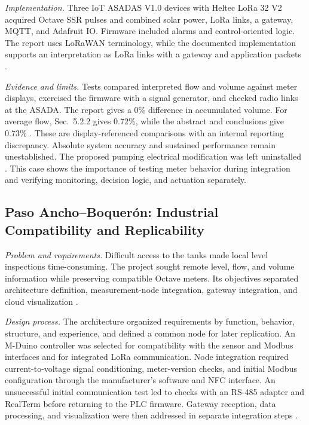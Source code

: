 \documentclass[conference]{IEEEtran}
\begin{document}
\textit{Implementation.} Three IoT ASADAS V1.0 devices with Heltec LoRa 32 V2 acquired Octave SSR pulses and combined solar power, LoRa links, a gateway, MQTT, and Adafruit IO. Firmware included alarms and control-oriented logic. The report uses LoRaWAN terminology, while the documented implementation supports an interpretation as LoRa links with a gateway and application packets \cite[Chs.~4--6]{solorzano2021sistema}.

\textit{Evidence and limits.} Tests compared interpreted flow and volume against meter displays, exercised the firmware with a signal generator, and checked radio links at the ASADA. The report gives a 0\% difference in accumulated volume. For average flow, Sec.~5.2.2 gives 0.72\%, while the abstract and conclusions give 0.73\% \cite{solorzano2021sistema}. These are display-referenced comparisons with an internal reporting discrepancy. Absolute system accuracy and sustained performance remain unestablished. The proposed pumping electrical modification was left uninstalled \cite[Ch.~7]{solorzano2021sistema}. This case shows the importance of testing meter behavior during integration and verifying monitoring, decision logic, and actuation separately.

\subsection{Paso Ancho--Boquerón: Industrial Compatibility and Replicability}
\textit{Problem and requirements.} Difficult access to the tanks made local level inspections time-consuming. The project sought remote level, flow, and volume information while preserving compatible Octave meters. Its objectives separated architecture definition, measurement-node integration, gateway integration, and cloud visualization \cite[Secs.~1.3--1.5 and 2.1]{oviedo2024desarrollo}.

\textit{Design process.} The architecture organized requirements by function, behavior, structure, and experience, and defined a common node for later replication. An M-Duino controller was selected for compatibility with the sensor and Modbus interfaces and for integrated LoRa communication. Node integration required current-to-voltage signal conditioning, meter-version checks, and initial Modbus configuration through the manufacturer's software and NFC interface. An unsuccessful initial communication test led to checks with an RS-485 adapter and RealTerm before returning to the PLC firmware. Gateway reception, data processing, and visualization were then addressed in separate integration steps \cite[Chs.~4--6 and Annex~9.2]{oviedo2024desarrollo}.
\end{document}

